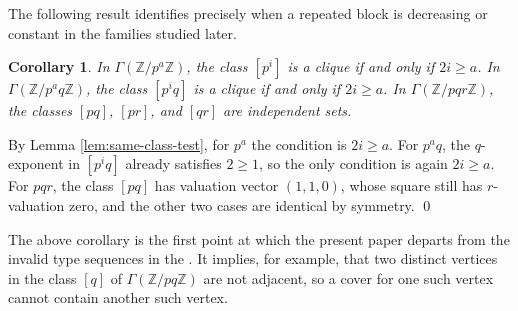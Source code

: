\documentclass[12pt]{article}
\newtheorem{corollary}[theorem]{Corollary}
\theoremstyle{definition}
\renewenvironment{proof}{{\bf \noindent Proof.}}{\qed}
\begin{document}
\medskip

\noindent The following result identifies precisely when a repeated block is decreasing or constant in the families studied later.
\begin{corollary}\label{cor:clique-independent-block}
In $\Gamma(\mathbb{Z}/p^a\mathbb{Z})$, the class $[p^i]$ is a clique if and only if $2i\geq a$.  In $\Gamma(\mathbb{Z}/p^a q\mathbb{Z})$, the class $[p^i q]$ is a clique if and only if $2i\geq a$.  In $\Gamma(\mathbb{Z}/pqr\mathbb{Z})$, the classes $[pq]$, $[pr]$, and $[qr]$ are independent sets.
\end{corollary}

\begin{proof}
By Lemma \ref{lem:same-class-test}, for $p^a$ the condition is $2i\geq a$.  For $p^a q$, the $q$-exponent in $[p^i q]$ already satisfies $2\geq 1$, so the only condition is again $2i\geq a$.  For $pqr$, the class $[pq]$ has valuation vector $(1,1,0)$, whose square still has $r$-valuation zero, and the other two cases are identical by symmetry.
\end{proof}

\medskip

The above corollary is the first point at which the present  paper departs from the invalid type sequences in the \cite{DungVu2026}.  It implies, for example, that two distinct vertices in the class $[q]$ of $\Gamma(\mathbb{Z}/pq\mathbb{Z})$ are not adjacent, so a cover for one such vertex cannot contain another such vertex.

\medskip
\end{document}
